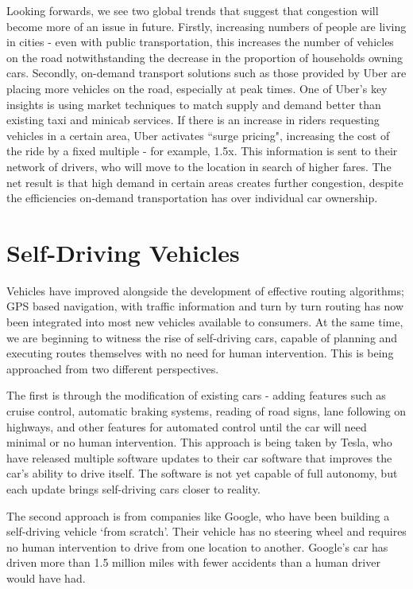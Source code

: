 \documentclass[ %
                    author={Alexander Hill},
                supervisor={Dr. Benjamin Sach},
                    degree={MEng},
                     title={MARMOSET},
                  subtitle={Multi-Agent Route Management using Online Simulation for Efficient Transportation},
                      type={research},
                      year={2016} ]{dissertation}
\begin{document}
Looking forwards, we see two global trends that suggest that congestion will
become more of an issue in future. Firstly, increasing numbers of people are
living in cities - even with public transportation, this increases the number of
vehicles on the road notwithstanding the decrease in the proportion of
households owning cars. Secondly, on-demand transport solutions such as those
provided by Uber are placing more vehicles on the road, especially at peak
times. One of Uber's key insights is using market techniques to match supply and
demand better than existing taxi and minicab services. If there is an increase
in riders requesting vehicles in a certain area, Uber activates ``surge
pricing", increasing the cost of the ride by a fixed multiple - for example,
1.5x. This information is sent to their network of drivers, who will move to the
location in search of higher fares. The net result is that high demand in
certain areas creates further congestion, despite the efficiencies on-demand
transportation has over individual car ownership.

\section{Self-Driving Vehicles}

Vehicles have improved alongside the development of effective routing
algorithms; GPS based navigation, with traffic information and turn by turn
routing has now been integrated into most new vehicles available to consumers. At
the same time, we are beginning to witness the rise of self-driving cars,
capable of planning and executing routes themselves with no need for human
intervention. This is being approached from two different perspectives.

The first is through the modification of existing cars - adding features such as
cruise control, automatic braking systems, reading of road signs, lane following
on highways, and other features for automated control until the car will need
minimal or no human intervention. This approach is being taken by Tesla, who
have released multiple software updates to their car software that improves the
car's ability to drive itself. The software is not yet capable of full autonomy,
but each update brings self-driving cars closer to reality.

The second approach is from companies like Google, who have been building a
self-driving vehicle `from scratch'. Their vehicle has no steering wheel and
requires no human intervention to drive from one location to another.  Google's
car has driven more than 1.5 million miles with fewer accidents than a human
driver would have had.
\end{document}
